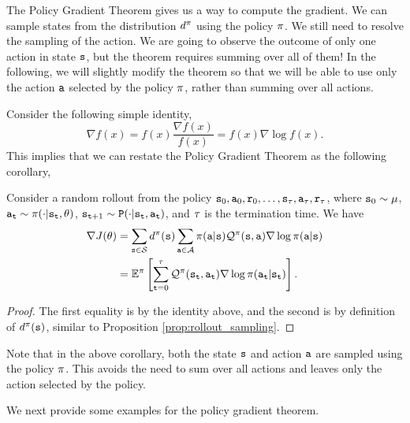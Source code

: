 The Policy Gradient Theorem gives us a way to compute the gradient.
We can sample states from the distribution $d^{\pi}$ using the
policy $\pi$. We still need to resolve the sampling of the
action. We are going to observe the outcome of only one action in
state ${\tt s}$, but the theorem requires summing over all of them!
In the following, we will slightly modify the theorem so that we will
be able to use only the action ${\tt a}$ selected by the policy
$\pi$, rather than summing over all actions.

Consider the following simple identity,
\begin{equation}\label{eq:log_likelihood_trick}
\nabla f(x)=f(x)\frac{\nabla f(x)}{f(x)}=f(x)\nabla \log f(x).
\end{equation}
This implies that we can restate the Policy Gradient Theorem as the
following corollary,
\begin{corollary} 
\label{thm:policy-gradient-corr} Consider a random rollout from the policy ${\tt s}_0,{\tt a}_0,{\tt r}_0,\dots,{\tt s}_\tau, {\tt a}_\tau, {\tt r}_\tau$, where ${\tt s}_0 \sim \mu$, ${\tt a}_{\tt t}\sim \pi(\cdot|{\tt s}_{\tt t},\theta)$, ${\tt s}_{{\tt t}+1} \sim {\tt P} (\cdot | {\tt s}_{\tt t}, {\tt a}_{\tt t})$, and $\tau$ is the termination time. We have
\begin{equation*}
\begin{split}
\nabla J(\theta) &= \sum_{{\tt s} \in \mathcal{S}} d^{\pi}({\tt s}) \sum_{{\tt a}\in
\mathcal{A}} \pi({\tt a}|{\tt s}) \mathcal{Q}^\pi
({\tt s},{\tt a}) \nabla \log \pi({\tt a}|{\tt s}) \\
&=\mathbb{E}^\pi\left[\sum_{{\tt t}=0}^{\tau}\mathcal{Q}^\pi ({\tt s}_{\tt t},{\tt a}_{\tt t})\nabla \log
\pi({\tt a}_{\tt t}|{\tt s}_{\tt t})\right].    
\end{split}
\end{equation*}
\end{corollary}
\begin{proof}
    The first equality is by the identity above, and the second is by definition of $d^{\pi}({\tt s})$, similar to Proposition \ref{prop:rollout_sampling}.
\end{proof}
Note that in the above corollary, both the state ${\tt s}$ and action
${\tt a}$ are sampled using the policy $\pi$. This avoids the need to sum over all actions and leaves only the action selected by the policy.

We next provide some examples for the policy gradient theorem.

